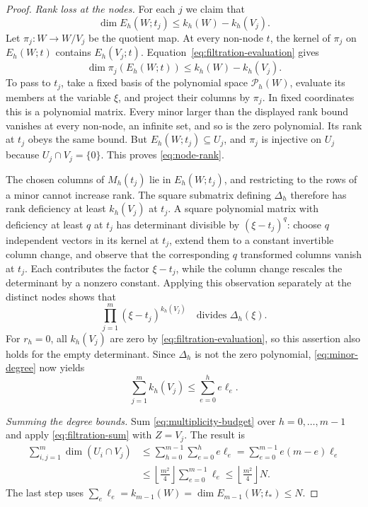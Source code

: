 \begin{proof}
\emph{Rank loss at the nodes.}
For each $j$ we claim that
\begin{equation}
\label{eq:node-rank}
  \dim E_h(W;t_j)\leq k_h(W)-k_h(V_j).
\end{equation}
Let $\pi_j:W\longrightarrow W/V_j$ be the quotient map.  At every
non-node $t$, the kernel of $\pi_j$ on $E_h(W;t)$ contains
$E_h(V_j;t)$.  Equation~\eqref{eq:filtration-evaluation} gives
\[
  \dim\pi_j(E_h(W;t))\leq k_h(W)-k_h(V_j).
\]
To pass to $t_j$, take a fixed basis of the polynomial space
$\mathcal P_h(W)$, evaluate its members at the variable $\xi$, and project
their columns by $\pi_j$.  In fixed coordinates this is a polynomial
matrix.  Every minor larger than the displayed rank bound vanishes at
every non-node, an infinite set, and so is the zero polynomial.  Its rank
at $t_j$ obeys the same bound.  But $E_h(W;t_j)\subseteq U_j$, and $\pi_j$
is injective on $U_j$ because $U_j\cap V_j=\{0\}$.  This proves
\eqref{eq:node-rank}.

The chosen columns of $M_h(t_j)$ lie in $E_h(W;t_j)$, and restricting
to the rows of a minor cannot increase rank.
The square submatrix defining $\Delta_h$ therefore has rank deficiency
at least $k_h(V_j)$ at $t_j$.  A square polynomial matrix with deficiency
at least $q$ at $t_j$ has determinant divisible by $(\xi-t_j)^q$:
choose $q$ independent vectors in its kernel at $t_j$, extend them to
a constant invertible column change, and observe that the corresponding
$q$ transformed columns vanish at $t_j$.  Each contributes the factor
$\xi-t_j$, while the column change rescales the determinant by a nonzero
constant.  Applying this observation separately at the distinct nodes
shows that
\[
  \prod_{j=1}^{m}(\xi-t_j)^{k_h(V_j)}\quad\text{divides }\Delta_h(\xi).
\]
For $r_h=0$, all $k_h(V_j)$ are zero by
\eqref{eq:filtration-evaluation}, so this assertion also holds for the
empty determinant.  Since $\Delta_h$ is not the zero polynomial,
\eqref{eq:minor-degree} now yields
\begin{equation}
\label{eq:multiplicity-budget}
  \sum_{j=1}^{m}k_h(V_j)\leq\sum_{e=0}^{h}e\ell_e.
\end{equation}

\emph{Summing the degree bounds.}
Sum \eqref{eq:multiplicity-budget} over $h=0,\ldots,m-1$ and apply
\eqref{eq:filtration-sum} with $Z=V_j$.  The result is
\begin{align*}
  \sum_{i,j=1}^{m}\dim(U_i\cap V_j)
  &\leq\sum_{h=0}^{m-1}\sum_{e=0}^{h}e\ell_e
   =\sum_{e=0}^{m-1}e(m-e)\ell_e\\
  &\leq\left\lfloor\frac{m^2}{4}\right\rfloor
           \sum_{e=0}^{m-1}\ell_e
   \leq\left\lfloor\frac{m^2}{4}\right\rfloor N.
\end{align*}
The last step uses
$\sum_e\ell_e=k_{m-1}(W)=\dim E_{m-1}(W;t_*)\leq N$.
\end{proof}

